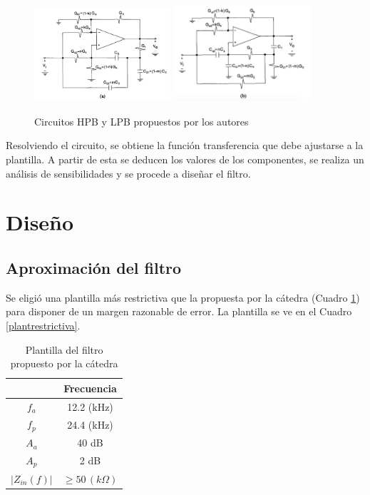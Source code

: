 \documentclass[spanish]{article}
\begin{document}
\begin{figure}[H]
\begin{centering}
\includegraphics[width=0.45\textwidth]{Resources/sedracirc1.png}
\includegraphics[width=0.45\textwidth]{Resources/sedracirc2.png}
\par\end{centering}
\caption{Circuitos HPB y LPB propuestos por los autores}
\label{sedracircs}
\end{figure}

Resolviendo el circuito, se obtiene la función transferencia que debe ajustarse a la plantilla. A partir de esta se deducen los valores de los componentes, se realiza un análisis de sensibilidades y se procede a diseñar el filtro.




\section{Diseño}
\subsection{Aproximación del filtro}
Se eligió una plantilla más restrictiva que la propuesta por la cátedra (Cuadro \ref{3_c_1}) para disponer de un margen razonable de error. La plantilla se ve en el Cuadro \ref{plantrestrictiva}. 

\begin{table}[H]
\begin{centering}
\begin{tabular}{|c|c|}
\hline 
 & Frecuencia\tabularnewline
\hline 
\hline 
$f_{a}$ & 12.2 (kHz)\tabularnewline
\hline 
$f_{p}$ & 24.4 (kHz)\tabularnewline
\hline 
$A_{a}$ & 40 dB\tabularnewline
\hline 
$A_{p}$ & 2 dB\tabularnewline
\hline 
$\left|Z_{in}(f)\right|$ & $\geq50\,(k\Omega)$\tabularnewline
\hline 
\end{tabular}
\par\end{centering}
\caption{Plantilla del filtro propuesto por la cátedra}
\label{3_c_1}
\end{table}
\end{document}
